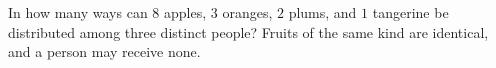 In how many ways can $8$ apples, $3$ oranges, $2$ plums, and $1$ tangerine be distributed among three distinct people? Fruits of the same kind are identical, and a person may receive none.

